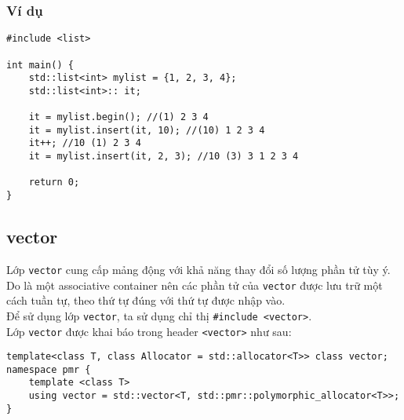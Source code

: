 \subsubsection{Ví dụ}
\begin{lstlisting}
#include <list>

int main() {
    std::list<int> mylist = {1, 2, 3, 4};
    std::list<int>:: it;
    
    it = mylist.begin(); //(1) 2 3 4
    it = mylist.insert(it, 10); //(10) 1 2 3 4
    it++; //10 (1) 2 3 4
    it = mylist.insert(it, 2, 3); //10 (3) 3 1 2 3 4
    
    return 0;
}
\end{lstlisting}

\subsection{vector}
Lớp \lstinline{vector} cung cấp mảng động với khả năng thay đổi số lượng phần tử tùy ý. Do là một associative container nên các phần tử của \lstinline{vector} được lưu trữ một cách tuần tự, theo thứ tự đúng với thứ tự được nhập vào.\\
Để sử dụng lớp \lstinline{vector}, ta sử dụng chỉ thị \lstinline{#include <vector>}.\\
Lớp \lstinline{vector} được khai báo trong header \lstinline{<vector>} như sau: \cite{anothervector}
\begin{lstlisting}
template<class T, class Allocator = std::allocator<T>> class vector;
namespace pmr {
    template <class T>
    using vector = std::vector<T, std::pmr::polymorphic_allocator<T>>;
}
\end{lstlisting}
